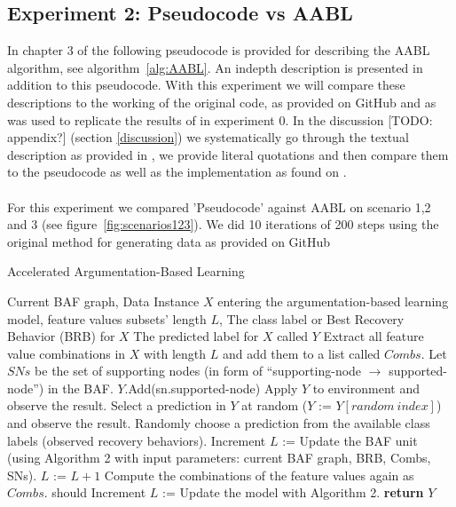 \documentclass{article}
\begin{document}
\subsection{Experiment 2: Pseudocode vs AABL}
\label{method2}
In chapter 3 of \cite{ayoobi2023fullthesis} the following pseudocode is provided for describing the AABL algorithm, see algorithm~\ref{alg:AABL}. An indepth description is presented in addition to this pseudocode. With this experiment we will compare these descriptions to the working of the original code, as provided on GitHub\cite{ayoobiGithub} and as was used to replicate the results of \cite{ayoobi2021argue} in experiment 0. In the discussion [TODO: appendix?] (section \ref{discussion}) we systematically go through the textual description as provided in  \cite{ayoobi2023fullthesis}, we provide literal quotations and then compare them to the pseudocode as well as the implementation as found on \cite{ayoobiGithub}.
\\\\
For this experiment we compared 'Pseudocode' against AABL \cite{ayoobiGithub} on scenario 1,2 and 3 (see figure~\ref{fig:scenarios123}). We did 10 iterations of 200 steps using the original method for generating data as provided on GitHub \cite{ayoobiGithub}

\begin{algorithm}[H]
\caption{Accelerated Argumentation-Based Learning}
\label{alg:AABL}
\begin{algorithmic}[1]
\Require Current BAF graph, Data Instance $X$ entering the argumentation-based learning model, feature values subsets' length $L$, The class label or Best Recovery Behavior (BRB) for $X$
\Ensure The predicted label for $X$ called $Y$
\State Extract all feature value combinations in $X$ with length $L$ and add them to a list called $Combs$.
\State Let $SNs$ be the set of supporting nodes (in form of “supporting-node $\rightarrow$ supported-node”) in the BAF.
\State $Y$.Add(sn.supported-node)
\EndIf
\EndFor
\EndFor
{}
\State Apply $Y$ to environment and observe the result.
\Else
\State Select a prediction in $Y$ at random ($Y$ := $Y[random\ index]$) and observe the result.
\EndIf
\Else
\State Randomly choose a prediction from the available class labels (observed recovery behaviors).
\State Increment $L$ := Update the BAF unit (using Algorithm 2 with input parameters: current BAF graph, BRB, Combs, SNs).
\EndIf
{}
\State $L$ := $L+1$
\State Compute the combinations of the feature values again as $Combs$.
\State should Increment $L$ := Update the model with Algorithm 2.
\EndWhile
\State \textbf{return} $Y$
\EndProcedure
\end{algorithmic}
\end{algorithm}
\end{document}
